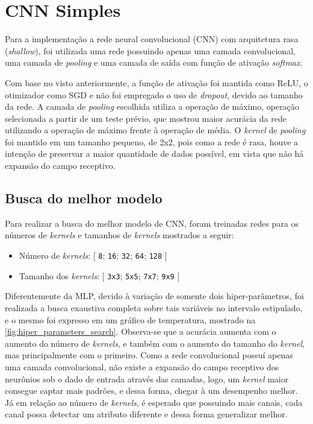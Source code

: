 \clearpage
\section{CNN Simples}

Para a implementação a rede neural convolucional (CNN) com arquitetura rasa (\textit{shallow}), foi utilizada uma rede possuindo apenas uma camada convolucional, uma camada de \textit{pooling} e uma camada de saída com função de ativação \textit{softmax}.

Com base no visto anteriormente, a função de ativação foi mantida como ReLU, o otimizador como SGD e não foi empregado o uso de \textit{dropout}, devido ao tamanho da rede. A camada de \textit{pooling} escolhida utiliza a operação de máximo, operação selecionada a partir de um teste prévio, que mostrou maior acurácia da rede utilizando a operação de máximo frente à operação de média. O \textit{kernel} de \textit{pooling} foi mantido em um tamanho pequeno, de 2x2, pois como a rede é rasa, houve a intenção de preservar a maior quantidade de dados possível, em vista que não há expansão do campo receptivo.

\subsection{Busca do melhor modelo}

Para realizar a busca do melhor modelo de CNN, foram treinadas redes para os números de \textit{kernels} e tamanhos de \textit{kernels} mostrados a seguir:

\begin{itemize}
	\item Número de \textit{kernels}: [ \texttt{8}; \texttt{16}; \texttt{32}; \texttt{64}; \texttt{128} ]
	\item Tamanho dos \textit{kernels}: [ \texttt{3x3}; \texttt{5x5}; \texttt{7x7}; \texttt{9x9} ]
\end{itemize}

Diferentemente da MLP, devido à variação de somente dois hiper-parâmetros, foi realizada a busca exaustiva completa sobre tais variáveis no intervalo estipulado, e o mesmo foi expresso em um gráfico de temperatura, mostrado na \autoref{fig:hiper_parameters_search}. Observa-se que a acurácia aumenta com o aumento do número de \textit{kernels}, e também com o aumento do tamanho do \textit{kernel}, mas principalmente com o primeiro. Como a rede convolucional possuí apenas uma camada convolucional, não existe a expansão do campo receptivo dos neurônios sob o dado de entrada através das camadas, logo, um \textit{kernel} maior consegue captar mais padrões, e dessa forma, chegar à um desempenho melhor. Já em relação ao número de \textit{kernels}, é esperado que possuindo mais canais, cada canal possa detectar um atributo diferente e dessa forma generalizar melhor.

